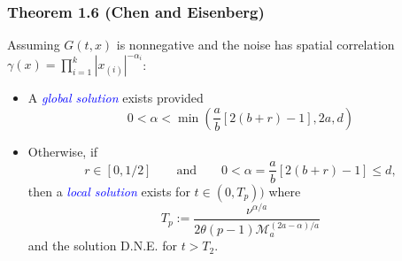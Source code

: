\documentclass{beamer}
\numberwithin{equation}{section}
\begin{document}
	\begin{frame}[t]
		\frametitle{Theorem 1.6 (Chen and Eisenberg)}
		Assuming $G(t,x)$ is nonnegative and the noise has spatial correlation $\gamma(x) = \prod_{i=1}^k |x_{(i)}|^{-\alpha_i}$:
		\begin{itemize}
			\item A \textcolor{blue}{\textit{global solution}} exists provided 
			\[
			0 < \alpha < \min\left( \frac{a}{b}[2(b+r) -1], 2a, d \right)
			\]
			\item Otherwise, if 
			\[
			r\in \left[0,1/2\right] \qquad \text{and} \qquad
			0<\alpha = \frac{a}{b}[2(b+r)-1] \le d,
			\]
			then a \textcolor{blue}{\textit{local solution}} exists for $t \in (0,T_p))$ where 
			\[
			T_p := \dfrac{\nu^{\alpha/a}}{2 \theta (p-1) \mathcal{M}_a^{(2a-\alpha)/a}}
			\]
			and the solution D.N.E. for $t > T_2$.
		\end{itemize}
	\end{frame}
	
\end{document}
